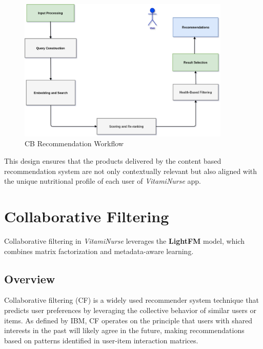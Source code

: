 \begin{center}
    \begin{figure}[H]
        \includegraphics[width=0.9\textwidth]{images/CB_recommendation_workflow_simple.png}
    \caption{CB Recommendation Workflow} 
    \label{fig:cb workflow}
\end{figure}
\end{center}

This design ensures that the products delivered by the content based recommendation system are not only contextually relevant but also aligned with the unique nutritional profile of each user of \textit{VitamiNurse} app.

\newpage
\section{Collaborative Filtering}
Collaborative filtering in \textit{VitamiNurse} leverages the \textbf{LightFM} model, which combines matrix factorization and metadata-aware learning. 
\subsection{Overview}

Collaborative filtering (CF) is a widely used recommender system technique that predicts user preferences by leveraging the collective behavior of similar users or items. As defined by IBM, CF operates on the principle that users with shared interests in the past will likely agree in the future, making recommendations based on patterns identified in user-item interaction matrices\cite{ibm-cf}.


